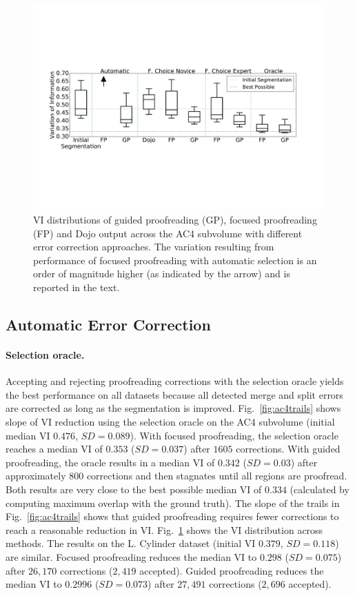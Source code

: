 \begin{figure}[t]
\begin{center}
\includegraphics[width=\linewidth]{gfx/ac4boxplot.pdf}
\end{center}
  \vspace{-4mm}
   \caption{VI distributions of guided proofreading (GP), focused proofreading (FP) and Dojo output across the AC4 subvolume with different error correction approaches. The variation resulting from performance of focused proofreading with automatic selection is an order of magnitude higher (as indicated by the arrow) and is reported in the text.}
\label{fig:ac4boxplot}
\end{figure}
\subsection{Automatic Error Correction}

\paragraph{Selection oracle.} Accepting and rejecting proofreading corrections with the selection oracle yields the best performance on all datasets because all detected merge and split errors are corrected as long as the segmentation is improved. Fig.~\ref{fig:ac4trails} shows slope of VI reduction using the selection oracle on the AC4 subvolume (initial median VI $0.476$, $SD=0.089$). With focused proofreading, the selection oracle reaches a median VI of $0.353$ ($SD=0.037$) after $1605$ corrections. With guided proofreading, the oracle results in a median VI of $0.342$ ($SD=0.03$) after approximately $800$ corrections and then stagnates until all regions are proofread. Both results are very close to the best possible median VI of $0.334$ (calculated by computing maximum overlap with the ground truth). The slope of the trails in Fig.~\ref{fig:ac4trails} shows that guided proofreading requires fewer corrections to reach a reasonable reduction in VI. Fig.~\ref{fig:ac4boxplot} shows the VI distribution across methods.
The results on the L. Cylinder dataset (initial VI $0.379$, $SD=0.118$) are similar. Focused proofreading reduces the median VI to $0.298$ ($SD=0.075$) after $26,170$ corrections ($2,419$ accepted). Guided proofreading reduces the median VI to $0.2996$ ($SD=0.073$) after $27,491$ corrections ($2,696$ accepted).

